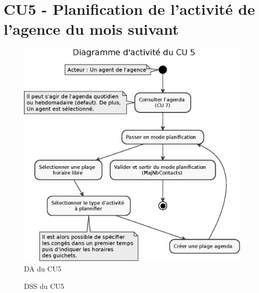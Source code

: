 \section{CU5 - Planification de l’activité de l’agence du mois suivant}

\begin{figure}[H]
\centering
\includegraphics[width=\textwidth]{figures/eps/DA_CU5.eps}
\caption{DA du CU5}
\end{figure}

\begin{figure}[H]
\noindent{}
\caption{DSS du CU5}
\end{figure}


